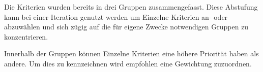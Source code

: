
Die Kriterien wurden bereits in drei Gruppen zusammengefasst.
Diese Abstufung kann bei einer Iteration genutzt werden um 
Einzelne Kriterien an- oder abzuwählen und
sich zügig auf die für eigene Zwecke notwendigen Gruppen zu konzentrieren.

Innerhalb der Gruppen können Einzelne Kriterien eine höhere Priorität haben als andere.
Um dies zu kennzeichnen wird empfohlen eine Gewichtung zuzuordnen.

